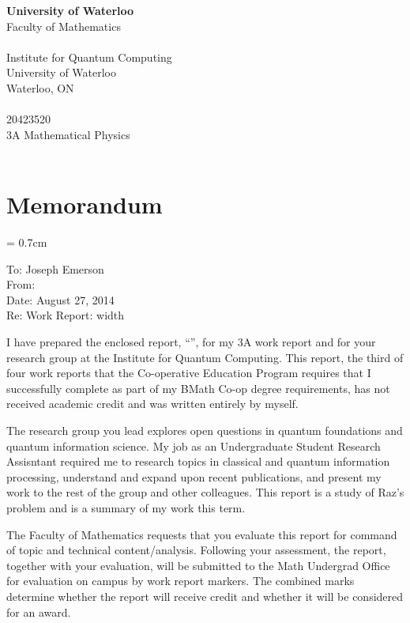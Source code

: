 \documentclass[../3Wworkreport.tex]{subfiles}
\begin{document}
\doublespacing
\makeatletter
\begin{titlepage}
	\begin{center}
		\huge \textbf{University of Waterloo}\\
		\small\textcolor{sub}{Faculty of Mathematics\\}
		\vfill
		\huge \textbf{\@title}\\
		\vfill
		\normalsize Institute for Quantum Computing\\University of Waterloo\\Waterloo, ON\\
		\vfill
		\@author\\20423520\\3A Mathematical Physics\\\@date\\
	\end{center}
\end{titlepage}
\makeatother
\newpage

\chapter*{Memorandum}
\singlespacing
\parskip = 0.7cm

\makeatletter
To: Joseph Emerson\\
From: \@author\\
Date: August 27, 2014\\
Re: Work Report: \@title
\vskip 0.5cm \leaders \vrule width \textwidth \vskip 0.4pt \nointerlineskip

I have prepared the enclosed report, ``\@title'', for my 3A work report and for your research group at the Institute for Quantum Computing. This report, the third of four work reports that the Co-operative Education Program requires that I successfully complete as part of my BMath Co-op degree requirements, has not received academic credit and was written entirely by myself. 

The research group you lead explores open questions in quantum foundations and quantum information science. My job as an Undergraduate Student Research Assisntant required me to research topics in classical and quantum information processing, understand and expand upon recent publications, and present my work to the rest of the group and other colleagues. This report is a study of Raz's problem and is a summary of my work this term.

The Faculty of Mathematics requests that you evaluate this report for command of topic and technical content/analysis. Following your assessment, the report, together with your evaluation, will be submitted to the Math Undergrad Office for evaluation on campus by work report markers. The combined marks determine whether the report will receive credit and whether it will be considered for an award.
\end{document}
